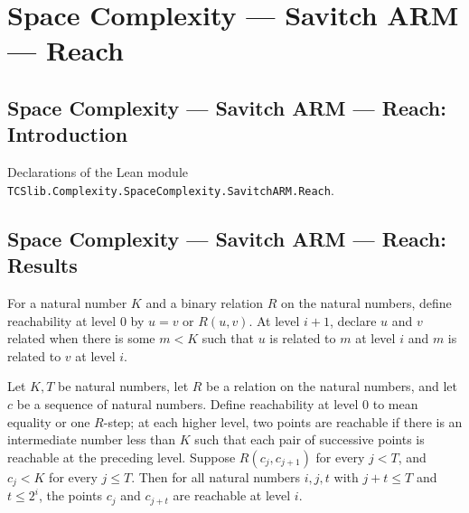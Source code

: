 \section{Space Complexity --- Savitch ARM --- Reach}
\subsection*{Space Complexity --- Savitch ARM --- Reach: Introduction}

Declarations of the Lean module \texttt{TCSlib.Complexity.SpaceComplexity.SavitchARM.Reach}.

\subsection*{Space Complexity --- Savitch ARM --- Reach: Results}

\begin{definition}
\label{Complexity.LogProg.SavitchARM.Reach}
\leanok
For a natural number $K$ and a binary relation $R$ on the natural numbers, define
reachability at level $0$ by $u=v$ or $R(u,v)$. At level $i+1$, declare $u$ and $v$
related when there is some $m<K$ such that $u$ is related to $m$ at level $i$ and $m$ is
related to $v$ at level $i$.
\end{definition}

\begin{theorem}
\label{Complexity.LogProg.SavitchARM.reach_of_chain}
\leanok
{}
Let $K,T$ be natural numbers, let $R$ be a relation on the natural numbers, and let $c$
be a sequence of natural numbers. Define reachability at level $0$ to mean equality or
one $R$-step; at each higher level, two points are reachable if there is an intermediate
number less than $K$ such that each pair of successive points is reachable at the
preceding level. Suppose $R(c_j,c_{j+1})$ for every $j<T$, and $c_j<K$ for every $j\le
T$. Then for all natural numbers $i,j,t$ with $j+t\le T$ and $t\le 2^i$, the points
$c_j$ and $c_{j+t}$ are reachable at level $i$.
\end{theorem}

